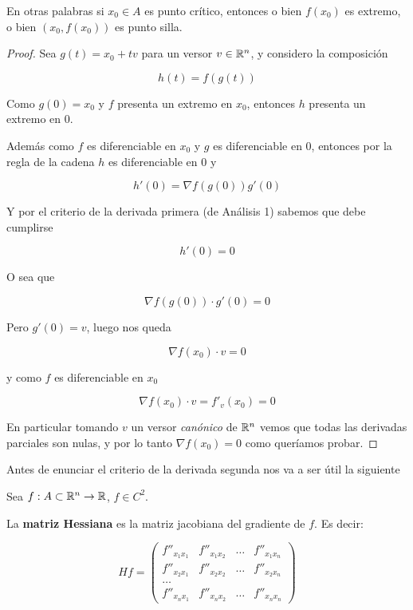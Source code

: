 En otras palabras si $x_0 \in A$ es punto crítico, entonces o bien $f(x_0)$ es extremo, o bien $(x_0, f(x_0))$ es punto silla.

\begin{proof}
Sea $g(t) = x_0 + t v$ para un versor $v \in \mathbb{R}^n$, y considero la composición 

$$h(t) = f(g(t))$$  

Como $g(0) = x_0$ y $f$ presenta un extremo en $x_0$, entonces $h$ presenta un extremo en $0$. 

Además como $f$ es diferenciable en $x_0$ y $g$ es diferenciable en $0$, entonces por la regla de la cadena $h$ es diferenciable en $0$ y

$$ h'(0) = \nabla f(g(0)) g'(0) $$

Y por el criterio de la derivada primera (de Análisis 1) sabemos que debe cumplirse 

$$ h'(0) = 0$$

O sea que

$$ \nabla f(g(0)) \cdot g'(0) = 0 $$

Pero $g'(0) = v$, luego nos queda

$$ \nabla f(x_0) \cdot v = 0$$

y como $f$ es diferenciable en $x_0$ 

$$ \nabla f(x_0) \cdot v = f'_v(x_0) = 0 $$

En particular tomando $v$ un versor \emph{canónico} de $\mathbb{R}^n$ vemos que todas las derivadas parciales son nulas, y por lo tanto $ \nabla f(x_0) = 0$ como queríamos probar.
\end{proof}

Antes de enunciar el criterio de la derivada segunda nos va a ser útil la siguiente

\begin{definition}
Sea $f : A \subset \mathbb{R}^n \to \mathbb{R}$, $f \in C^2$.

La \textbf{matriz Hessiana}  es la matriz jacobiana del gradiente de $f$.  Es decir:

$$ Hf = \begin{pmatrix} f''_{x_1 x_1} & f''_{x_1 x_2} & \ldots & f''_{x_1 x_n} \\ f''_{x_2 x_1} & f''_{x_2 x_2} & \ldots & f''_{x_2 x_n} \\ \ldots \\ f''_{x_n x_1} & f''_{x_n x_2} & \ldots & f''_{x_n x_n} \end{pmatrix} $$

\end{definition}

